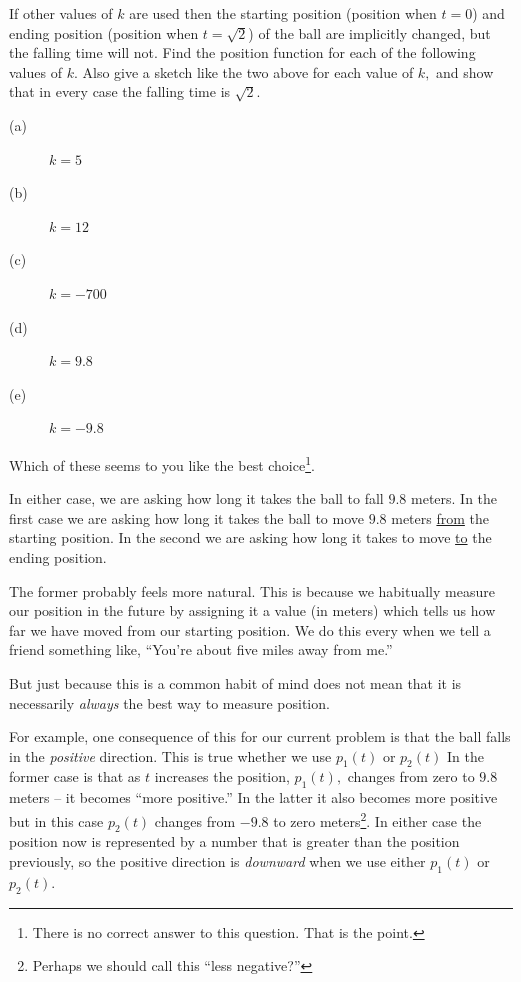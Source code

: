 \begin{embeddedproblem}{}
  If other values of $k$ are used then the starting position (position
  when $t=0$) and ending position (position when $t=\sqrt{2}$) of the
  ball are implicitly changed, but the falling time will not. Find the
  position function for each of the following values of $k.$ Also give
  a sketch like the two above for each value of $k,$ and show that in
  every case the falling time is $\sqrt{2}.$
  \begin{multicols}{2}
    \begin{description}
    \item[(a)] $k=5$
    \item[(b)] $k=12$
    \item[(c)] $k=-700$
    \item[(d)] $k=9.8$
    \item[(e)] $k=-9.8$
    \end{description}
  \end{multicols}
  Which of these seems to you like the best choice\footnote{There is
    no correct answer to this question. That is the point.}.
\end{embeddedproblem}

In either case, we are asking how long it takes the ball to fall $9.8$
meters. In the first case we are asking how long it takes the ball
to move $9.8$ meters \underline{from} the starting position. In the
second we are asking how long it takes to move \underline{to} the
ending position.

The former probably feels more natural. This is because we habitually
measure our position in the future by assigning it a value (in meters)
which tells us how far we have moved from our starting position. We do
this every when we tell a friend something like, ``You're about
five miles away from me.''

But just because this is a common habit of mind does not mean that it
is necessarily \emph{always} the best way to measure position.

For example, one consequence of this for our current problem is that
the ball falls in the \emph{positive} direction. This is true whether
we use $p_1(t)$ or $p_2(t)$ In the former case is that as $t$
increases the position, $p_1(t),$ changes from zero to $9.8$ meters -- it becomes
``more positive.'' In the latter it also becomes more positive but in
this case $p_2(t)$ changes from $-9.8$ to zero meters\footnote{Perhaps
we should call this ``less negative?''}. In either case the position
now is represented by a number that is greater than the position
previously, so the positive direction is \emph{downward} when we use
either $p_1(t)$ or $p_2(t).$  

